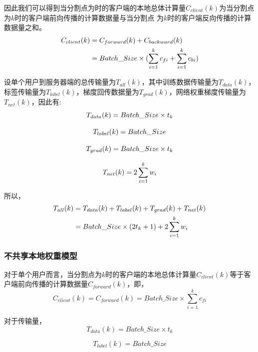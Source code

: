 \documentclass{article}
\begin{document}
因此我们可以得到当分割点为时的客户端的本地总体计算量$C_{client}(k)$为当分割点为$k$时的客户端前向传播的计算数据量与当分割点
为$k$时的客户端反向传播的计算数据量之和。
\begin{align}
    C_{client}(k) & =C_{forward}(k)+C_{backward}(k) \notag\\
    & =Batch\_Size\times (\sum_{i=1}^k c_{fi}+\sum_{i=1}^k c_{bi})
\end{align}

设单个⽤户到服务器端的总传输量为$T_{all}(k)$，其中训练数据传输量为$T_{data}(k)$，标签传输量为$T_{label}(k)$，梯度回传数据量为$T_{grad}(k)$，网络权重梯度传输量为$T_{net}(k)$，因此有:
\begin{equation}
    \centering
    T_{data}(k)=Batch\_Size\times t_k
\end{equation}

\begin{equation}
    \centering
    T_{label}(k) = Batch\_Size
\end{equation}

\begin{equation}
    \centering
    T_{grad}(k) = Batch\_Size \times t_k
\end{equation}

\begin{equation}
    \centering
    T_{net}(k)=2\sum_{i=1}^k w_i
\end{equation}

所以，
\begin{align}
    T_{all}(k) & = T_{data}(k)+T_{label}(k)+ T_{grad}(k)+T_{net}(k) \notag\\
    & = Batch\_Size \times (2t_k+1)+2\sum_{i=1}^k w_i
\end{align}

\subsubsection{不共享本地权重模型}
对于单个⽤户⽽⾔，当分割点为$k$时的客户端的本地总体计算量$C_{client}(k)$等于客户端前向传播的计算数据量$C_{forward}(k)$，即，
\begin{equation}
    C_{client}(k) = C_{forward}(k)=Batch\_Size\times \sum_{i=1}^k c_{fi}
\end{equation}

对于传输量，
\begin{equation}
    T_{data}(k)=Batch\_Size\times t_k
\end{equation}

\begin{equation}
    T_{label}(k) = Batch\_Size
\end{equation}
\end{document}
